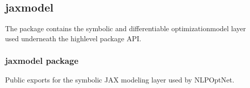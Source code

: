 \documentclass[letterpaper,10pt,english,openany,oneside]{sphinxmanual}
\begin{document}
\sphinxstepscope


\subsection{jaxmodel}
\label{\detokenize{api/core/jaxmodel/index:jaxmodel}}\label{\detokenize{api/core/jaxmodel/index::doc}}
\sphinxAtStartPar
The  package contains the symbolic and differentiable optimization\sphinxhyphen{}model layer used underneath the high\sphinxhyphen{}level package API.

\sphinxstepscope


\subsubsection{jaxmodel package}
\label{\detokenize{api/core/jaxmodel/module_init:jaxmodel-package}}\label{\detokenize{api/core/jaxmodel/module_init::doc}}
\sphinxAtStartPar
Public exports for the symbolic JAX modeling layer used by NLPOptNet.
\end{document}
